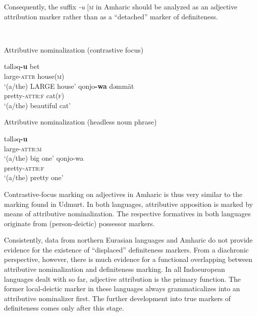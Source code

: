 {Consequently, the suffix \textit{-u} [\textsc{m} in Amharic should be analyzed as an adjective attribution marker rather than as a “detached” marker of definiteness. 
\begin{exe}
\ex	{}\\
\begin{xlist}
\ex	Attributive nominalization (contrastive focus)
\begin{xlist}
\ex
\gll	təlləq\textbf{-u} bet\\
	large-\textsc{attr} house(\textsc{m})\\
\glt	‘(a/the) LARGE house’
\ex	
\gll	qonjo\textbf{-wa} dəmmät\\
	pretty-\textsc{attr:f} cat(\textsc{f})\\
\glt	‘(a/the) beautiful cat’
\end{xlist}
\ex	Attributive nominalization (headless noun phrase)
\begin{xlist}
\ex
\gll	təlləq\textbf{-u}\\
	large-\textsc{attr:m}\\
\glt	‘(a/the) big one’
\ex	
\gll	qonjo-wa\\
	pretty-\textsc{attr:f}\\
\glt	‘(a/the) pretty one’
\end{xlist}
\end{xlist}
\end{exe}
Contrastive-focus marking on adjectives in Amharic is thus very similar to the marking found in Udmurt. In both languages, attributive apposition is marked by means of attributive nominalization. The respective formatives in both languages originate from (person-deictic) possessor markers.

Consistently, data from northern Eurasian languages and Amharic do not provide evidence for the existence of “displaced” definiteness markers. From a diachronic perspective, however, there is much evidence for a functional overlapping between attributive nominalization and definiteness marking. In all Indoeuropean languages dealt with so far, adjective attribution is the primary function. The former local-deictic marker in these languages always grammaticalizes into an attributive nominalizer first. The further development into true markers of definiteness comes only after this stage.

}
